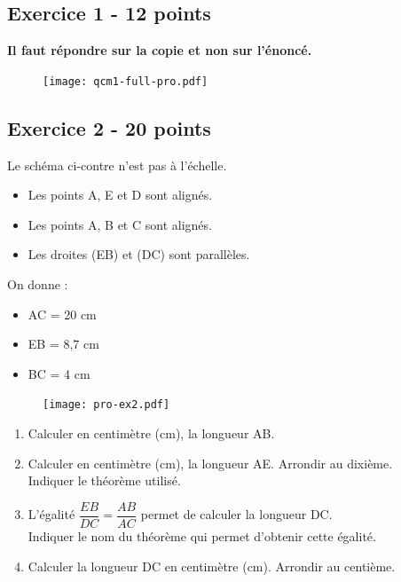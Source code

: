 \begin{titlepage}
    \vfill 
    
    \end{titlepage}

\newpage
\setcounter{page}{2}
\subsection*{Exercice 1 - 12 points }
\textbf{Il faut répondre sur la copie et non sur l'énoncé. }
\begin{figure}[H]
  \centering
  \texttt{[image: qcm1-full-pro.pdf]}
\end{figure}


\newpage
\subsection*{Exercice 2 - 20 points }

\begin{multicols}{2}
Le schéma ci-contre n'est pas à l'échelle. 

\begin{itemize}[label={$\bullet$}]
  \item Les points A, E et D sont alignés.
  \item Les points A, B et C sont alignés.
  \item Les droites (EB) et (DC) sont parallèles. 
\end{itemize} 

On donne :

\begin{itemize}[label={$\bullet$}]
  \item AC = 20 cm
  \item EB = 8,7 cm 
  \item BC = 4 cm
\end{itemize} \columnbreak

\begin{figure}[H]
  \centering
  \texttt{[image: pro-ex2.pdf]}
\end{figure}

\end{multicols}

\begin{enumerate}
  \item[1.] Calculer en centimètre (cm), la longueur AB. \\
  \item[2.] Calculer en centimètre (cm), la longueur AE. Arrondir au dixième. \\
  Indiquer le théorème utilisé. \\
  \item[3.] L'égalité $\dfrac{EB}{DC} = \dfrac{AB}{AC}$ permet de calculer la longueur DC.\\
  Indiquer le nom du théorème qui permet d'obtenir cette égalité. \\
  \item[4.] Calculer la longueur DC en centimètre (cm). Arrondir au centième.  
\end{enumerate}


